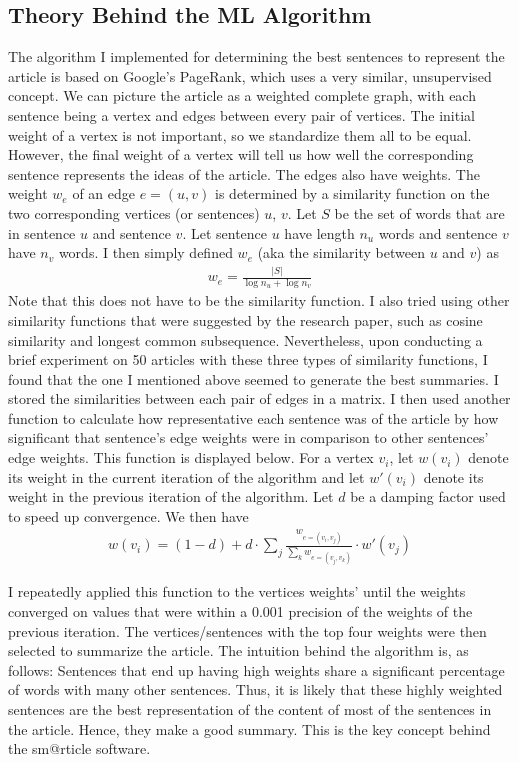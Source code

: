 \documentclass[11pt, margin=1in]{article}
\newcommand{\card}[1]{\ensuremath{\left\vert#1\right\vert}}
\begin{document}
\subsection{Theory Behind the ML Algorithm}
The algorithm I implemented for determining the best sentences to represent the article is based on Google's PageRank, which uses a very similar, unsupervised concept.  We can picture the article as a weighted complete graph, with each sentence being a vertex and edges between every pair of vertices.  The initial weight of a vertex is not important, so we standardize them all to be equal.  However, the final weight of a vertex will tell us how well the corresponding sentence represents the ideas of the article.
The edges also have weights.  The weight $w_e$ of an edge $e = (u, v)$ is determined by a similarity function on the two corresponding vertices (or sentences) $u$, $v$.  Let $S$ be the set of words that are in sentence $u$ and sentence $v$.  Let sentence $u$ have length $n_u$ words and sentence $v$ have $n_v$ words.  I then simply defined $w_e$ (aka the similarity between $u$ and $v$) as
\begin{align*}
w_e = \frac{\card{S}}{\log{n_u} + \log{n_v}}
\end{align*}
Note that this does not have to be the similarity function.  I also tried using other similarity functions that were suggested by the research paper, such as cosine similarity and longest common subsequence.  Nevertheless, upon conducting a brief experiment on 50 articles with these three types of similarity functions, I found that the one I mentioned above seemed to generate the best summaries.  I stored the similarities between each pair of edges in a matrix.  I then used another function to calculate how representative each sentence was of the article by how significant that sentence's edge weights were in comparison to other sentences' edge weights.  This function is displayed below.  For a vertex $v_i$, let $w(v_i)$ denote its weight in the current iteration of the algorithm and let $w'(v_i)$ denote its weight in the previous iteration of the algorithm.  Let $d$ be a damping factor used to speed up convergence.  We then have 
\begin{align*}
w(v_i) = (1 - d) + d \cdot \sum_{j} \frac{w_{e = (v_i, v_j)}}{\sum_{k} w_{e = (v_j, v_k)}} \cdot w'(v_j)  
\end{align*}

I repeatedly applied this function to the vertices weights' until the weights converged on values that were within a 0.001 precision of the weights of the previous iteration.  The vertices/sentences with the top four weights were then selected to summarize the article. 
The intuition behind the algorithm is, as follows: Sentences that end up having high weights share a significant percentage of words with many other sentences.  Thus, it is likely that these highly weighted sentences are the best representation of the content of most of the sentences in the article.  Hence, they make a good summary.  This is the key concept behind the sm@rticle software.              
\end{document}
